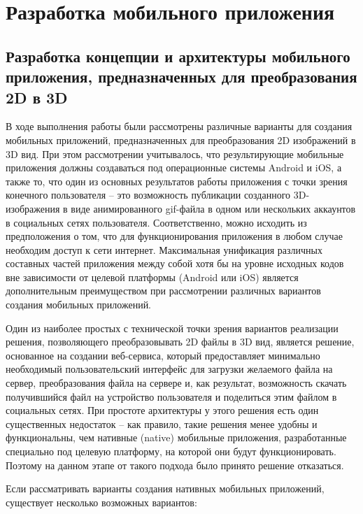 
\section{Разработка мобильного приложения}

\subsection{Разработка концепции и архитектуры мобильного приложения, предназначенных для преобразования 2D в 3D}
В ходе выполнения работы были рассмотрены различные варианты для создания мобильных приложений, предназначенных для преобразования 2D изображений в 3D вид. При этом рассмотрении учитывалось, что результирующие мобильные приложения должны создаваться под операционные системы Android и iOS, а также то, что один из основных результатов работы приложения с точки зрения конечного пользователя – это возможность публикации созданного 3D-изображения в виде анимированного gif-файла в одном или нескольких аккаунтов в социальных сетях пользователя. Соответственно, можно исходить из предположения о том, что для функционирования приложения в любом случае необходим доступ к сети интернет. Максимальная унификация различных составных частей приложения между собой хотя бы на уровне исходных кодов вне зависимости от целевой платформы (Android или iOS) является дополнительным преимуществом при рассмотрении различных вариантов создания мобильных приложений.

Один из наиболее простых с технической точки зрения вариантов реализации решения, позволяющего преобразовывать 2D файлы в 3D вид, является решение, основанное на создании веб-сервиса, который предоставляет минимально необходимый пользовательский интерфейс для загрузки желаемого файла на сервер, преобразования файла на сервере и, как результат, возможность скачать получившийся файл на устройство пользователя и поделиться этим файлом в социальных сетях. При простоте архитектуры у этого решения есть один существенных недостаток – как правило, такие решения менее удобны и функциональны, чем нативные (native) мобильные приложения, разработанные специально под целевую платформу, на которой они будут функционировать. Поэтому на данном этапе от такого подхода было принято решение отказаться.

Если рассматривать варианты создания нативных мобильных приложений, существует несколько возможных вариантов:

